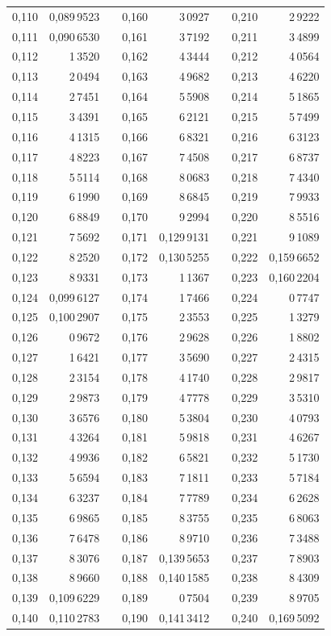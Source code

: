 \begin{tabular}{|r|r|@{}p{9pt}@{}|r|r|@{}p{9pt}@{}|r|r|}
0,110 & 0,089\,9523 &  & 0,160 & 3\,0927 &  & 0,210 & 2\,9222 \\[3pt]
0,111 & 0,090\,6530 &  & 0,161 & 3\,7192 &  & 0,211 & 3\,4899 \\
0,112 & 1\,3520 &  & 0,162 & 4\,3444 &  & 0,212 & 4\,0564 \\
0,113 & 2\,0494 &  & 0,163 & 4\,9682 &  & 0,213 & 4\,6220 \\
0,114 & 2\,7451 &  & 0,164 & 5\,5908 &  & 0,214 & 5\,1865 \\
0,115 & 3\,4391 &  & 0,165 & 6\,2121 &  & 0,215 & 5\,7499 \\[3pt]
0,116 & 4\,1315 &  & 0,166 & 6\,8321 &  & 0,216 & 6\,3123 \\
0,117 & 4\,8223 &  & 0,167 & 7\,4508 &  & 0,217 & 6\,8737 \\
0,118 & 5\,5114 &  & 0,168 & 8\,0683 &  & 0,218 & 7\,4340 \\
0,119 & 6\,1990 &  & 0,169 & 8\,6845 &  & 0,219 & 7\,9933 \\
0,120 & 6\,8849 &  & 0,170 & 9\,2994 &  & 0,220 & 8\,5516 \\[3pt]
0,121 & 7\,5692 &  & 0,171 & 0,129\,9131 &  & 0,221 & 9\,1089 \\
0,122 & 8\,2520 &  & 0,172 & 0,130\,5255 &  & 0,222 & 0,159\,6652 \\
0,123 & 8\,9331 &  & 0,173 & 1\,1367 &  & 0,223 & 0,160\,2204 \\
0,124 & 0,099\,6127 &  & 0,174 & 1\,7466 &  & 0,224 & 0\,7747 \\
0,125 & 0,100\,2907 &  & 0,175 & 2\,3553 &  & 0,225 & 1\,3279 \\[3pt]
0,126 & 0\,9672 &  & 0,176 & 2\,9628 &  & 0,226 & 1\,8802 \\
0,127 & 1\,6421 &  & 0,177 & 3\,5690 &  & 0,227 & 2\,4315 \\
0,128 & 2\,3154 &  & 0,178 & 4\,1740 &  & 0,228 & 2\,9817 \\
0,129 & 2\,9873 &  & 0,179 & 4\,7778 &  & 0,229 & 3\,5310 \\
0,130 & 3\,6576 &  & 0,180 & 5\,3804 &  & 0,230 & 4\,0793 \\[3pt]
0,131 & 4\,3264 &  & 0,181 & 5\,9818 &  & 0,231 & 4\,6267 \\
0,132 & 4\,9936 &  & 0,182 & 6\,5821 &  & 0,232 & 5\,1730 \\
0,133 & 5\,6594 &  & 0,183 & 7\,1811 &  & 0,233 & 5\,7184 \\
0,134 & 6\,3237 &  & 0,184 & 7\,7789 &  & 0,234 & 6\,2628 \\
0,135 & 6\,9865 &  & 0,185 & 8\,3755 &  & 0,235 & 6\,8063 \\[3pt]
0,136 & 7\,6478 &  & 0,186 & 8\,9710 &  & 0,236 & 7\,3488 \\
0,137 & 8\,3076 &  & 0,187 & 0,139\,5653 &  & 0,237 & 7\,8903 \\
0,138 & 8\,9660 &  & 0,188 & 0,140\,1585 &  & 0,238 & 8\,4309 \\
0,139 & 0,109\,6229 &  & 0,189 & 0\,7504 &  & 0,239 & 8\,9705 \\
0,140 & 0,110\,2783 &  & 0,190 & 0,141\,3412 &  & 0,240 & 0,169\,5092 \\
\hline
\end{tabular}\par

